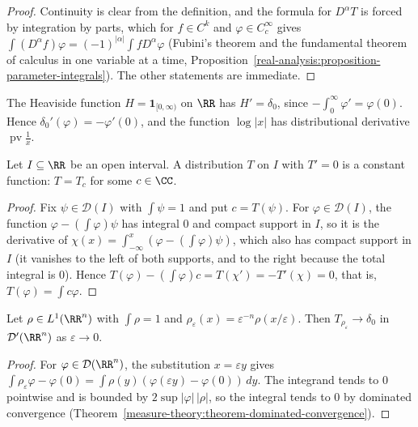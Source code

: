 \begin{proof}
Continuity is clear from the definition, and the formula for $D^\alpha T$ is forced by integration by parts, which for $f \in C^k$ and $\varphi \in C_c^\infty$ gives
$\int (D^\alpha f)\varphi = (-1)^{|\alpha|}\int f D^\alpha\varphi$ (Fubini's theorem and the fundamental theorem of calculus in one variable at a time,
Proposition~\ref{real-analysis:proposition-parameter-integrals}). The other statements are immediate.
\end{proof}

\begin{example}\label{distributions:example-heaviside}
The Heaviside function $H = \mathbf{1}_{[0,\infty)}$ on $\RR$ has $H' = \delta_0$, since $-\int_0^\infty\varphi' = \varphi(0)$. Hence $\delta_0' (\varphi) = -\varphi'(0)$, and the function $\log|x|$ has
distributional derivative $\operatorname{pv}\frac1x$.
\end{example}

\begin{proposition}\label{distributions:proposition-zero-derivative}
Let $I \subseteq \RR$ be an open interval. A distribution $T$ on $I$ with $T' = 0$ is a constant function: $T = T_c$ for some $c \in \CC$.
\end{proposition}

\begin{proof}
Fix $\psi \in \mathcal{D}(I)$ with $\int\psi = 1$ and put $c = T(\psi)$. For $\varphi \in \mathcal{D}(I)$, the function $\varphi - (\int\varphi)\psi$ has integral $0$ and compact support in $I$, so it is the derivative of
$\chi(x) = \int_{-\infty}^x(\varphi - (\int\varphi)\psi)$, which also has compact support in $I$ (it vanishes to the left of both supports, and to the right because the total integral is $0$). Hence
$T(\varphi) - (\int\varphi)c = T(\chi') = -T'(\chi) = 0$, that is, $T(\varphi) = \int c\varphi$.
\end{proof}

\begin{proposition}\label{distributions:proposition-approximate-identity}
Let $\rho \in L^1(\RR^n)$ with $\int\rho = 1$ and $\rho_\varepsilon(x) = \varepsilon^{-n}\rho(x/\varepsilon)$. Then $T_{\rho_\varepsilon} \to \delta_0$ in $\mathcal{D}'(\RR^n)$ as $\varepsilon \to 0$.
\end{proposition}

\begin{proof}
For $\varphi \in \mathcal{D}(\RR^n)$, the substitution $x = \varepsilon y$ gives $\int\rho_\varepsilon\varphi - \varphi(0) = \int\rho(y)(\varphi(\varepsilon y) - \varphi(0))\,dy$. The integrand tends to $0$ pointwise and is bounded by
$2\sup|\varphi|\,|\rho|$, so the integral tends to $0$ by dominated convergence (Theorem~\ref{measure-theory:theorem-dominated-convergence}).
\end{proof}


